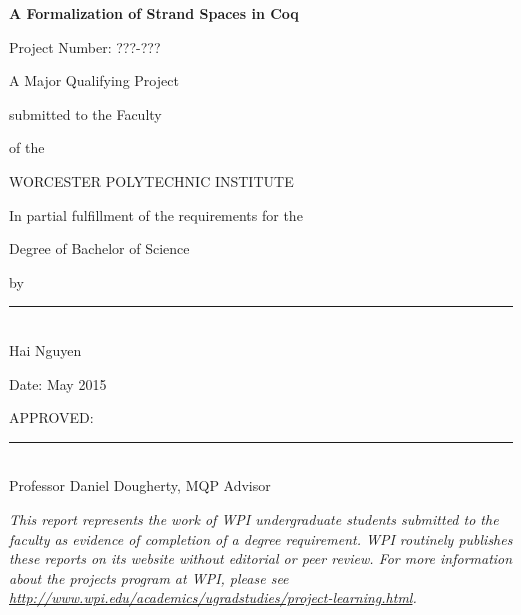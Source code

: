 %
\thispagestyle{empty}

\begin{center}

\bigskip

{\large \textbf{ 	A Formalization of Strand Spaces in Coq }}

\bigskip
\begin{flushright}
  Project Number: ???-???
\end{flushright}
\bigskip %
A Major Qualifying Project

\bigskip
submitted to the Faculty

\bigskip
of the 

\bigskip
WORCESTER POLYTECHNIC INSTITUTE
	
\bigskip
In partial fulfillment of the requirements for the

\bigskip
Degree of Bachelor of Science

\bigskip
by

\bigskip\bigskip
\rule{3in}{1.2pt}
\\
Hai Nguyen


\bigskip
Date: May 2015

\end{center}

	
\vfill
APPROVED:

\vfill

\noindent \rule{3in}{0.8pt}
\\
Professor Daniel Dougherty, MQP Advisor

\bigskip \bigskip

{\small \em
This report represents the work of WPI undergraduate students
submitted to the faculty as evidence of completion of a degree
requirement. WPI routinely publishes these reports on its website
without editorial or peer review. For more information about the
projects program at WPI, please see
\url{http://www.wpi.edu/academics/ugradstudies/project-learning.html}.
}
